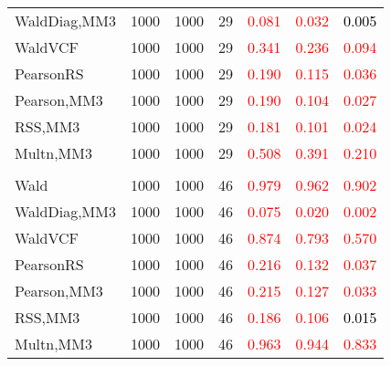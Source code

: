 \documentclass[
]{article}
\begin{document}
\begin{table}[H]
{\begin{tabular}[t]{lrrrrrr}
\hspace{1em}WaldDiag,MM3 & 1000 & 1000 & 29 & \textcolor{red}{0.081} & \textcolor{red}{0.032} & \textcolor{black}{0.005}\\
\hspace{1em}WaldVCF & 1000 & 1000 & 29 & \textcolor{red}{0.341} & \textcolor{red}{0.236} & \textcolor{red}{0.094}\\
\hspace{1em}PearsonRS & 1000 & 1000 & 29 & \textcolor{red}{0.190} & \textcolor{red}{0.115} & \textcolor{red}{0.036}\\
\hspace{1em}Pearson,MM3 & 1000 & 1000 & 29 & \textcolor{red}{0.190} & \textcolor{red}{0.104} & \textcolor{red}{0.027}\\
\hspace{1em}RSS,MM3 & 1000 & 1000 & 29 & \textcolor{red}{0.181} & \textcolor{red}{0.101} & \textcolor{red}{0.024}\\
\hspace{1em}Multn,MM3 & 1000 & 1000 & 29 & \textcolor{red}{0.508} & \textcolor{red}{0.391} & \textcolor{red}{0.210}\\
\addlinespace[0.3em]
\multicolumn{7}{l}{\textbf{3F 15V}}\\
\hspace{1em}Wald & 1000 & 1000 & 46 & \textcolor{red}{0.979} & \textcolor{red}{0.962} & \textcolor{red}{0.902}\\
\hspace{1em}WaldDiag,MM3 & 1000 & 1000 & 46 & \textcolor{red}{0.075} & \textcolor{red}{0.020} & \textcolor{red}{0.002}\\
\hspace{1em}WaldVCF & 1000 & 1000 & 46 & \textcolor{red}{0.874} & \textcolor{red}{0.793} & \textcolor{red}{0.570}\\
\hspace{1em}PearsonRS & 1000 & 1000 & 46 & \textcolor{red}{0.216} & \textcolor{red}{0.132} & \textcolor{red}{0.037}\\
\hspace{1em}Pearson,MM3 & 1000 & 1000 & 46 & \textcolor{red}{0.215} & \textcolor{red}{0.127} & \textcolor{red}{0.033}\\
\hspace{1em}RSS,MM3 & 1000 & 1000 & 46 & \textcolor{red}{0.186} & \textcolor{red}{0.106} & \textcolor{black}{0.015}\\
\hspace{1em}Multn,MM3 & 1000 & 1000 & 46 & \textcolor{red}{0.963} & \textcolor{red}{0.944} & \textcolor{red}{0.833}\\
\bottomrule
\end{tabular}}
\endgroup{}
\end{table}
\end{document}
